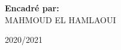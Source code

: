 \begin{titlepage}
\begin{center}
\begin{minipage}{0.4\textwidth}
\begin{flushleft}
\end{flushleft}
\end{minipage}
\begin{minipage}{0.4\textwidth}
\begin{flushright} \large
\textbf{Encadré par:} \\
\vspace{0.8cm}
MAHMOUD \textsc{EL HAMLAOUI }\\

\end{flushright}
\end{minipage}

\vspace{1cm}
\vfill

2020/2021


\end{center}
\end{titlepage}
